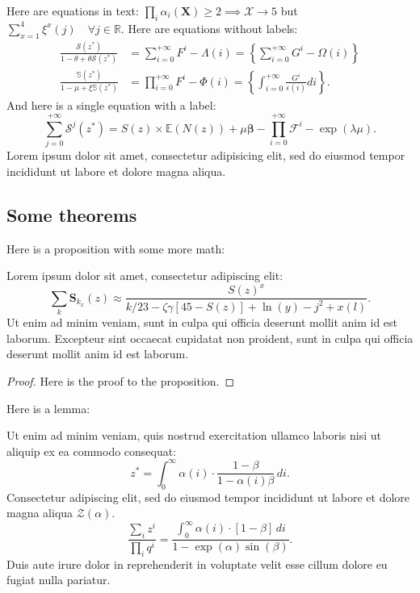 \documentclass[letterpaper,12pt,leqno]{article}
\begin{document}
Here are equations in text: $\prod_i\alpha_i(\bm{X}) \geq 2 \implies \mathcal{X} \to 5$ but  $\sum_{x=1}^4 \xi^x(j) \quad \forall j\in \mathbb{R}$. Here are equations without labels:
\begin{align*}
\frac{\mathcal{S}(z^*)}{1 -\theta + \theta \mathcal{S}(z^*)} &= \sum_{i=0}^{+\infty}F^{i} - \Lambda(i) = \left\lbrace\sum_{i=0}^{+\infty}G^{i} - \Omega(i)\right\rbrace\\
\frac{\mathbb{S}(z^*)}{1 -\mu + \xi \mathbb{S}(z^*)} &= \prod_{i=0}^{+\infty}F^{i} - \Phi(i) = \left\lbrace\int_{i=0}^{+\infty}\frac{G^{i}}{\epsilon(i)} di\right\rbrace.
\end{align*}
And here is a single equation with a label:
\begin{equation}
\sum_{j=0}^{+\infty}\mathcal{S}^j(z^{\ast}) = S(z) \times \mathbb{E}(N(z)) + \mathbb{\mu} \bm{\beta} - \prod_{i=0}^{+\infty}\mathcal{F}^{i}-\exp(\lambda \mu).
\label{e:type1steps}\end{equation}
Lorem ipsum dolor sit amet, consectetur adipisicing elit, sed do eiusmod
tempor incididunt ut labore et dolore magna aliqua.

\subsection{Some theorems}

Here is a proposition with some more math:   

\begin{proposition}\label{p:type1}  Lorem ipsum dolor sit amet, consectetur adipiscing elit:
\begin{equation}
\sum_k\bm{S}_{k_x}(z) \approx \frac{S(z)^x}{k / 23 -\zeta\gamma [45- S(z)] + \ln(y) - j^2+x(l)}.
\label{e:type1}\end{equation}
Ut enim ad minim veniam, sunt in culpa qui officia deserunt mollit anim id est laborum. Excepteur sint occaecat cupidatat non proident, sunt in culpa qui officia deserunt mollit anim id est laborum.
\end{proposition}

\begin{proof} Here is the proof to the proposition.\end{proof} 

Here is a lemma:

\begin{lemma}\label{p:cv} Ut enim ad minim veniam, quis nostrud exercitation ullamco laboris nisi ut aliquip ex ea commodo consequat:
\begin{equation}
z^* = \int_{0}^{\infty} \alpha(i) \cdot \frac{1-\beta}{1-\alpha(i)\beta}\,di.
\label{e:cv}\end{equation}
Consectetur adipiscing elit, sed do eiusmod tempor incididunt ut labore et dolore magna aliqua $\mathcal{Z}(\alpha)$. 
\begin{equation*}
\frac{\sum_i z^i}{\prod_i q^i} = \frac{\int_{0}^{\infty} \alpha(i) \cdot [1-\beta]\,di}{1-\exp(\alpha)\sin(\beta)}.
\end{equation*}
Duis aute irure dolor in reprehenderit in voluptate velit esse cillum dolore eu fugiat nulla pariatur. 
\end{lemma}
\end{document}

